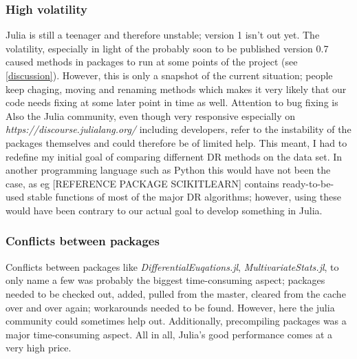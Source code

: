 \documentclass[journal, a4paper]{IEEEtran}
\begin{document}
\subsubsection{High volatility}
Julia is still a teenager and therefore unstable; version 1 isn't out yet. The volatility, especially in light of the probably soon to be published version 0.7
caused methods in packages to run at some points of the project (see \ref{discussion}). %
However, this is only a snapshot of the current situation; people keep chaging, moving and renaming methods which makes it very likely that our code needs fixing at some later point in time as well. Attention to bug fixing is 
Also the Julia community, even though very responsive especially on \textit{https://discourse.julialang.org/} including developers, refer to the instability of the packages themselves and could therefore be of limited help. %
This meant, I had to redefine my initial goal of comparing differnent DR methods on the data set.
In another programming language such as Python this would have not been the case, as eg [REFERENCE PACKAGE SCIKITLEARN] contains ready-to-be-used stable functions of most of the major DR algorithms; however, using these would have been contrary to our actual goal to develop something in Julia.

\subsubsection{Conflicts between packages}
Conflicts between packages like \textit{DifferentialEuqations.jl}, \textit{MultivariateStats.jl},  to only name a few was probably the biggest time-consuming aspect; packages needed to be checked out, added, pulled from the master, cleared from the cache over and over again; workarounds needed to be found. 
However, here the julia community could sometimes help out.
Additionally, precompiling packages was a major time-consuming aspect. All in all, Julia's good performance comes at a very high price.

\end{document}
